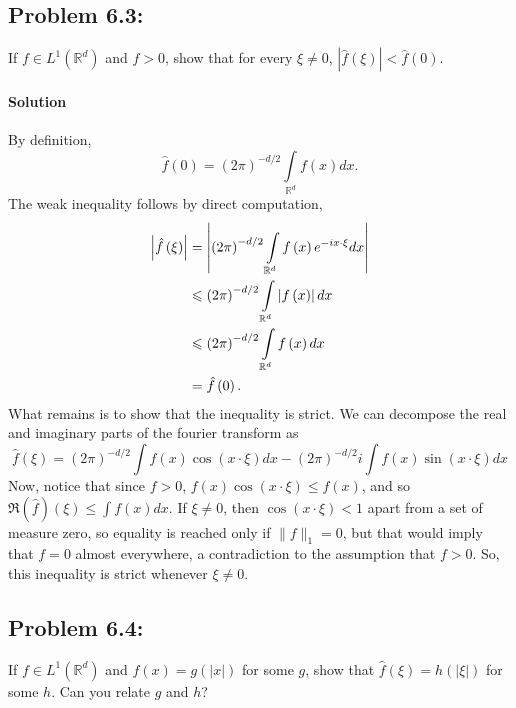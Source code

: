 \documentclass[letterpaper,twoside,11pt]{article}
\theoremstyle{mystyle}
\newcommand{\R}{{\mathbb R}}
\begin{document}
\newpage \subsection*{Problem 6.3:}
If $f\in L^1\left( \R^d \right)$ and $f>0$, show that for every $\xi\neq 0$, $\left\vert \hat f \left( \xi \right) \right\vert< \hat f\left( 0 \right)$. 

\paragraph*{Solution} By definition, 
\[\hat f\left( 0 \right) = {\left( {2\pi } \right)^{ - d/2}}\int\limits_{{\mathbb{R}^d}} {f\left( x \right)dx} .\]
The weak inequality follows by direct computation, 
\begin{align*}
  \left| {\hat f\left( \xi  \right)} \right| &= \left| {{{\left( {2\pi } \right)}^{ - d/2}}\int\limits_{{\mathbb{R}^d}} {f\left( x \right){e^{ - ix \cdot \xi }}dx} } \right| \hfill \\
   &\leqslant {\left( {2\pi } \right)^{ - d/2}}\int\limits_{{\mathbb{R}^d}} {\left| {f\left( x \right)} \right|dx}  \hfill \\
   &\leqslant {\left( {2\pi } \right)^{ - d/2}}\int\limits_{{\mathbb{R}^d}} {f\left( x \right)dx}  \hfill \\
   &= \hat f\left( 0 \right) .
\end{align*}
What remains is to show that the inequality is strict.
We can decompose the real and imaginary parts of the fourier transform as 
\[\hat f\left( \xi \right)= \left( 2\pi \right)^{-d/2} \int f(x)\cos\left( x\cdot \xi \right)dx - \left( 2\pi \right)^{-d/2}i \int f(x) \sin\left( x\cdot \xi \right)dx \]
Now, notice that since $f>0$, $f(x) \cos(x\cdot \xi) \leq f(x)$, and so 
$\mathfrak R\left( \hat f \right)\left( \xi \right) \leq \int f(x) dx.$ If $\xi \neq 0$, then $\cos(x\cdot \xi) <1$ apart from a set of measure zero, so equality is reached only if $\|f\|_1=0$, but that would imply that $f=0$ almost everywhere, a contradiction to the assumption that $f>0$. So, this inequality is strict whenever $\xi \neq 0$. 












\subsection*{Problem 6.4:}
If $f\in L^1\left( \R^d \right)$ and $f(x) = g\left( \left\vert x\right\vert  \right)$ for some $g$, show that $\hat f\left( \xi \right) = h\left( \left\vert \xi\right\vert \right) $ for some $h$. Can you relate $g$ and $h$? 
\end{document}
